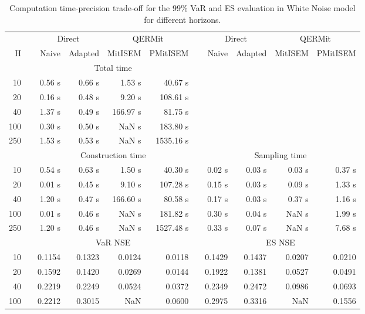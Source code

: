 { \renewcommand{\arraystretch}{1.3} 
\begin{table}[h] 
\centering 
\caption{Computation time-precision trade-off for the  $99\%$ VaR and ES evaluation in White Noise model for different horizons.} 
\label{tab:time_precision_WN} 
\begin{tabular}{rr rrrr r rrrr}  
 & & \multicolumn{2}{c}{Direct} & \multicolumn{2}{c}{QERMit}&  & \multicolumn{2}{c}{Direct} & \multicolumn{2}{c}{QERMit} \\ \cline{3-6} \cline{8-11} 
 H & & Naive & Adapted & MitISEM & PMitISEM & & Naive & Adapted & MitISEM & PMitISEM \\ \hline 
 & & \multicolumn{4}{c}{Total time}  \\ \cline{3-6} 
10 & & 0.56 s & 0.66 s & 1.53 s & 40.67 s \\ 
20 & & 0.16 s & 0.48 s & 9.20 s & 108.61 s \\ 
40 & & 1.37 s & 0.49 s & 166.97 s & 81.75 s \\ 
100 & & 0.30 s & 0.50 s &  NaN s & 183.80 s \\ 
250 & & 1.53 s & 0.53 s &  NaN s & 1535.16 s \\ 
\hline 
 & & \multicolumn{4}{c}{Construction time} & & \multicolumn{4}{c}{ Sampling time} \\ \cline{3-6}  \cline{8-11}
10 & & 0.54 s & 0.63 s & 1.50 s & 40.30 s && 0.02 s & 0.03 s & 0.03 s & 0.37 s \\ 
20 & & 0.01 s & 0.45 s & 9.10 s & 107.28 s && 0.15 s & 0.03 s & 0.09 s & 1.33 s \\ 
40 & & 1.20 s & 0.47 s & 166.60 s & 80.58 s && 0.17 s & 0.03 s & 0.37 s & 1.16 s \\ 
100 & & 0.01 s & 0.46 s &  NaN s & 181.82 s && 0.30 s & 0.04 s &  NaN s & 1.99 s \\ 
250 & & 1.20 s & 0.46 s &  NaN s & 1527.48 s && 0.33 s & 0.07 s &  NaN s & 7.68 s \\ 
\hline 
 & & \multicolumn{4}{c}{VaR NSE} &&  \multicolumn{4}{c}{ES NSE} \\ \cline{3-6}  \cline{8-11}
10 && 0.1154  & 0.1323  & 0.0124 & 0.0118 && 0.1429  & 0.1437  & 0.0207 & 0.0210 \\ 
20 && 0.1592  & 0.1420  & 0.0269 & 0.0144 && 0.1922  & 0.1381  & 0.0527 & 0.0491 \\ 
40 && 0.2219  & 0.2249  & 0.0524 & 0.0372 && 0.2349  & 0.2472  & 0.0986 & 0.0693 \\ 
100 && 0.2212  & 0.3015  &    NaN & 0.0600 && 0.2975  & 0.3316  &    NaN & 0.1556 \\ 

\end{tabular}
\end{table}}
